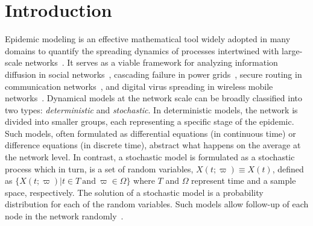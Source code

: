 \section{Introduction}
\label{sec:intro}

Epidemic modeling is an effective mathematical tool widely adopted in many domains to quantify the spreading dynamics of processes intertwined with large-scale networks~\cite{Vynnycky2010}. It serves as a viable framework for analyzing information diffusion in social networks~\cite{Dadlani2017}, cascading failure in power grids~\cite{Korkali2017}, secure routing in communication networks~\cite{Cheng2017}, and digital virus spreading in wireless mobile networks~\cite{Yang2018}. Dynamical models at the network scale can be broadly classified into two types: \emph{deterministic} and \emph{stochastic}. In deterministic models, the network is divided into smaller groups, each representing a specific stage of the epidemic. Such models, often formulated as differential equations (in continuous time) or difference equations (in discrete time), abstract what happens on the average at the network level. In contrast, a stochastic model is formulated as a stochastic process which in turn, is a set of random variables, $X(t;\varpi) \!\equiv \! X(t)$, defined as $\{X(t;\varpi)| t \!\in T~\textrm{and}~\varpi \!\in \!\Omega\}$ where $T$ and $\Omega$ represent time and a sample space, respectively. The solution of a stochastic model is a probability distribution for each of the random variables. Such models allow follow-up of each node in the network randomly~\cite{Brauer2001,Britton2010}.

